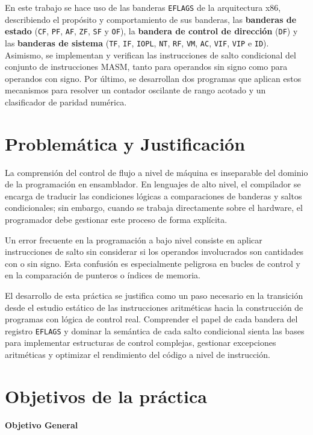 \documentclass[a4paper,12pt]{article}
\begin{document}
En este trabajo se hace uso de las banderas \texttt{EFLAGS} de la arquitectura x86, describiendo el propósito y comportamiento de sus banderas, las \textbf{banderas de estado} (\texttt{CF}, \texttt{PF}, \texttt{AF}, \texttt{ZF}, \texttt{SF} y \texttt{OF}), la \textbf{bandera de control de dirección} (\texttt{DF}) y las \textbf{banderas de sistema} (\texttt{TF}, \texttt{IF}, \texttt{IOPL}, \texttt{NT}, \texttt{RF}, \texttt{VM}, \texttt{AC}, \texttt{VIF}, \texttt{VIP} e \texttt{ID}). Asimismo, se implementan y verifican las instrucciones de salto condicional del conjunto de instrucciones MASM, tanto para operandos sin signo como para operandos con signo. Por último, se desarrollan dos programas que aplican estos mecanismos para resolver un contador oscilante de rango acotado y un clasificador de paridad numérica.

\section{Problemática y Justificación}
La comprensión del control de flujo a nivel de máquina es inseparable del dominio de la programación en ensamblador. En lenguajes de alto nivel, el compilador se encarga de traducir las condiciones lógicas a comparaciones de banderas y saltos condicionales; sin embargo, cuando se trabaja directamente sobre el hardware, el programador debe gestionar este proceso de forma explícita.

Un error frecuente en la programación a bajo nivel consiste en aplicar instrucciones de salto sin considerar si los operandos involucrados son cantidades con o sin signo. Esta confusión es especialmente peligrosa en bucles de control y en la comparación de punteros o índices de memoria.

El desarrollo de esta práctica se justifica como un paso necesario en la transición desde el estudio estático de las instrucciones aritméticas hacia la construcción de programas con lógica de control real. Comprender el papel de cada bandera del registro \texttt{EFLAGS} y dominar la semántica de cada salto condicional sienta las bases para implementar estructuras de control complejas, gestionar excepciones aritméticas y optimizar el rendimiento del código a nivel de instrucción.

\section{Objetivos de la práctica}
\textbf{Objetivo General}
\end{document}
